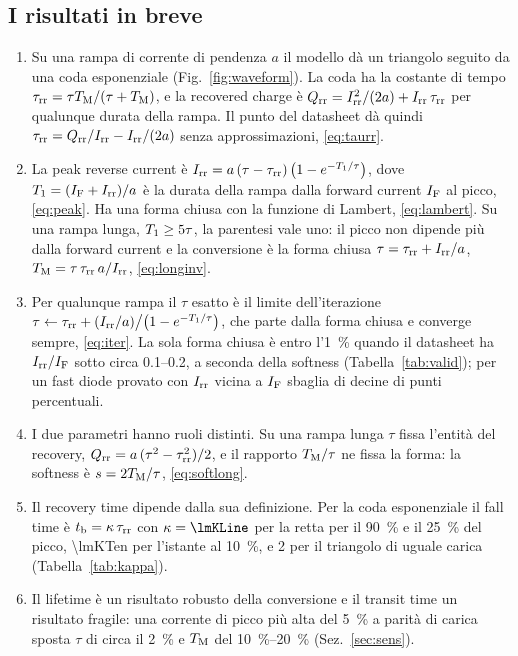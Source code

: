\documentclass[10pt,a4paper]{scrartcl}
\let\newcommand\lmitdefine
\newcommand{\IF}{I_\mathrm{F}}
\newcommand{\Irr}{I_\mathrm{rr}}
\newcommand{\Qrr}{Q_\mathrm{rr}}
\newcommand{\tb}{t_\mathrm{b}}
\newcommand{\taurr}{\tau_\mathrm{rr}}
\newcommand{\TM}{T_\mathrm{M}}
\newcommand{\Tone}{T_1}
\begin{document}
\subsection*{I risultati in breve}
\begin{enumerate}
\item Su una rampa di corrente di pendenza $a$ il modello dà un triangolo seguito da una coda esponenziale (Fig.~\ref{fig:waveform}). La coda ha la costante di tempo $\taurr = \tau\TM/(\tau+\TM)$, e la recovered charge è $\Qrr = \Irr^2/(2a) + \Irr\,\taurr$ per qualunque durata della rampa. Il punto del datasheet dà quindi $\taurr = \Qrr/\Irr - \Irr/(2a)$ senza approssimazioni, \eqref{eq:taurr}.
\item La peak reverse current è $\Irr = a\,(\tau-\taurr)\,\bigl(1-e^{-\Tone/\tau}\bigr)$, dove $\Tone = (\IF+\Irr)/a$ è la durata della rampa dalla forward current $\IF$ al picco, \eqref{eq:peak}. Ha una forma chiusa con la funzione di Lambert, \eqref{eq:lambert}. Su una rampa lunga, $\Tone \geq 5\tau$, la parentesi vale uno: il picco non dipende più dalla forward current e la conversione è la forma chiusa $\tau = \taurr + \Irr/a$, $\TM = \tau\,\taurr\,a/\Irr$, \eqref{eq:longinv}.
\item Per qualunque rampa il $\tau$ esatto è il limite dell'iterazione $\tau \leftarrow \taurr + (\Irr/a)\big/\bigl(1-e^{-\Tone/\tau}\bigr)$, che parte dalla forma chiusa e converge sempre, \eqref{eq:iter}. La sola forma chiusa è entro l'\SI{1}{\percent} quando il datasheet ha $\Irr/\IF$ sotto circa \numrange{0.1}{0.2}, a seconda della softness (Tabella~\ref{tab:valid}); per un fast diode provato con $\Irr$ vicina a $\IF$ sbaglia di decine di punti percentuali.
\item I due parametri hanno ruoli distinti. Su una rampa lunga $\tau$ fissa l'entità del recovery, $\Qrr = a\,(\tau^2-\taurr^2)/2$, e il rapporto $\TM/\tau$ ne fissa la forma: la softness è $s = 2\TM/\tau$, \eqref{eq:softlong}.
\item Il recovery time dipende dalla sua definizione. Per la coda esponenziale il fall time è $\tb = \kappa\,\taurr$ con $\kappa = \lmKLine$ per la retta per il \SI{90}{\percent} e il \SI{25}{\percent} del picco, \num{\lmKTen} per l'istante al \SI{10}{\percent}, e 2 per il triangolo di uguale carica (Tabella~\ref{tab:kappa}).
\item Il lifetime è un risultato robusto della conversione e il transit time un risultato fragile: una corrente di picco più alta del \SI{5}{\percent} a parità di carica sposta $\tau$ di circa il \SI{2}{\percent} e $\TM$ del \SIrange{10}{20}{\percent} (Sez.~\ref{sec:sens}).

\end{enumerate}
\end{document}
